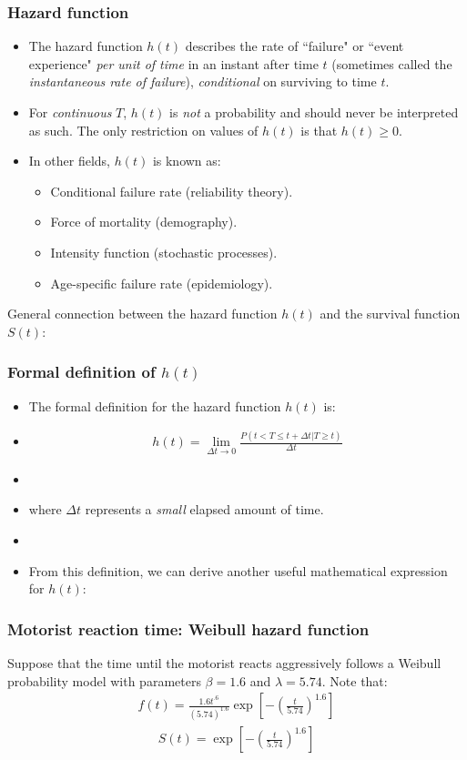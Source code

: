 \begin{frame}
\frametitle{Hazard function}
\begin{itemize}
\item  The hazard function $h(t)$ describes the rate of ``failure" or ``event experience" \textit{per unit of time} in an instant after time $t$ (sometimes called the \textit{instantaneous rate of failure}), \textit{conditional} on surviving to time $t$.
\item For \textit{continuous} $T$, $h(t)$ is \textit{not} a probability and should never be interpreted as such. The only restriction on values of $h(t)$ is that $h(t) \geq 0$.
\item In other fields, $h(t)$ is known as:
\begin{itemize}
\item Conditional failure rate (reliability theory).
\item Force of mortality (demography).
\item Intensity function (stochastic processes).
\item Age-specific failure rate (epidemiology).
\end{itemize}
\end{itemize}
General connection between the hazard function $h(t)$ and the survival function $S(t)$:
\vskip30pt
\end{frame}

\begin{frame}
\frametitle{Formal definition of $h(t)$}
\begin{itemize}
\item The formal definition for the hazard function $h(t)$ is:
\item[]
\begin{eqnarray}
h(t)= \lim_{\Delta t\rightarrow 0}\frac{P(t<T\leq t+\Delta t|T \geq t)}{\Delta t} \nonumber
\end{eqnarray}
\item[]
\item[]
where $\Delta t$ represents a \textit{small} elapsed amount of time.
\item[]
\item From this definition, we can derive another useful mathematical expression for $h(t)$:
\end{itemize}
\vskip100pt
\end{frame}

\begin{frame}
\frametitle{Motorist reaction time: Weibull hazard function}
Suppose that the time until the motorist reacts aggressively follows a Weibull probability model with parameters $\beta=1.6$ and $\lambda=5.74$.  Note that:
\begin{eqnarray}
f(t) = \frac{1.6t^{.6}}{(5.74)^{1.6}}\exp \left[-\left(\frac{t}{5.74}\right)^{1.6} \right] \nonumber
\end{eqnarray}
\vskip5pt
\begin{eqnarray}
S(t)=\exp\left[ -\left(\frac{t}{5.74} \right)^{1.6} \right] \nonumber
\end{eqnarray}
\end{frame}


